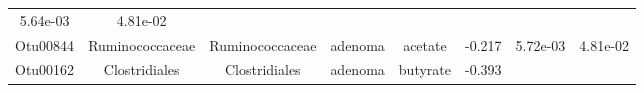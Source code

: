 \documentclass[11pt,]{article}
\begin{document}
\begin{longtable}[]{@{}cccccccc@{}}
\begin{minipage}[t]{0.08\columnwidth}
5.64e-03\strut
\end{minipage} & \begin{minipage}[t]{0.08\columnwidth}\centering\strut
4.81e-02\strut
\end{minipage}\tabularnewline
\begin{minipage}[t]{0.08\columnwidth}\centering\strut
Otu00844\strut
\end{minipage} & \begin{minipage}[t]{0.15\columnwidth}\centering\strut
Ruminococcaceae\strut
\end{minipage} & \begin{minipage}[t]{0.15\columnwidth}\centering\strut
Ruminococcaceae\strut
\end{minipage} & \begin{minipage}[t]{0.08\columnwidth}\centering\strut
adenoma\strut
\end{minipage} & \begin{minipage}[t]{0.09\columnwidth}\centering\strut
acetate\strut
\end{minipage} & \begin{minipage}[t]{0.07\columnwidth}\centering\strut
-0.217\strut
\end{minipage} & \begin{minipage}[t]{0.08\columnwidth}\centering\strut
5.72e-03\strut
\end{minipage} & \begin{minipage}[t]{0.08\columnwidth}\centering\strut
4.81e-02\strut
\end{minipage}\tabularnewline
\begin{minipage}[t]{0.08\columnwidth}\centering\strut
Otu00162\strut
\end{minipage} & \begin{minipage}[t]{0.15\columnwidth}\centering\strut
Clostridiales\strut
\end{minipage} & \begin{minipage}[t]{0.15\columnwidth}\centering\strut
Clostridiales\strut
\end{minipage} & \begin{minipage}[t]{0.08\columnwidth}\centering\strut
adenoma\strut
\end{minipage} & \begin{minipage}[t]{0.09\columnwidth}\centering\strut
butyrate\strut
\end{minipage} & \begin{minipage}[t]{0.07\columnwidth}\centering\strut
-0.393\strut
\end{minipage} & \begin{minipage}[t]{0.08\columnwidth}\centering\strut

\end{minipage}
\end{longtable}
\end{document}
